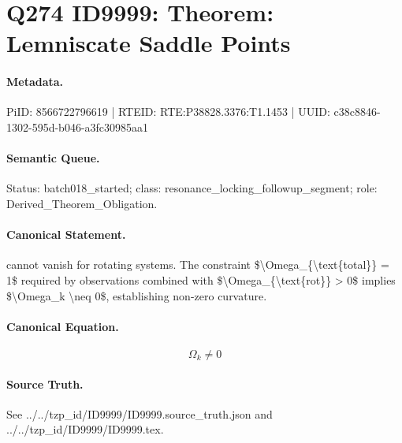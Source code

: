 \section*{Q274 ID9999: Theorem: Lemniscate Saddle Points}
\paragraph{Metadata.}
PiID: 8566722796619 | RTEID: RTE:P38828.3376:T1.1453 | UUID: c38c8846-1302-595d-b046-a3fc30985aa1

\paragraph{Semantic Queue.}
Status: batch018\_started; class: resonance\_locking\_followup\_segment; role: Derived\_Theorem\_Obligation.

\paragraph{Canonical Statement.}
cannot vanish for rotating systems. The constraint \$\textbackslash{}Omega\_\{\textbackslash{}text\{total\}\} = 1\$ required by observations combined with \$\textbackslash{}Omega\_\{\textbackslash{}text\{rot\}\} > 0\$ implies \$\textbackslash{}Omega\_k \textbackslash{}neq 0\$, establishing non-zero curvature.

\paragraph{Canonical Equation.}
\[
\Omega_k \neq 0
\]

\paragraph{Source Truth.}
See ../../tzp\_id/ID9999/ID9999.source\_truth.json and ../../tzp\_id/ID9999/ID9999.tex.
